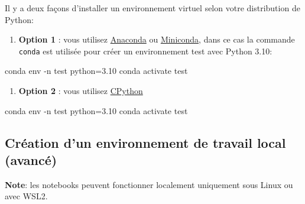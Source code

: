 \documentclass[
  11pt,
  letterpaper,
  open=any,
  twoside=false,
  french]{scrbook}
\newenvironment{Shaded}{\begin{snugshade}}{\end{snugshade}}
\newcommand{\AttributeTok}[1]{\textcolor[rgb]{0.40,0.45,0.13}{#1}}
\newcommand{\ExtensionTok}[1]{\textcolor[rgb]{0.00,0.23,0.31}{#1}}
\newcommand{\NormalTok}[1]{\textcolor[rgb]{0.00,0.23,0.31}{#1}}
\providecommand{\tightlist}{%
  \setlength{\itemsep}{0pt}\setlength{\parskip}{0pt}}\usepackage{longtable,booktabs,array}
\begin{document}
Il y a deux façons d'installer un environnement virtuel selon votre
distribution de Python:

\begin{enumerate}
\def\labelenumi{\arabic{enumi}.}
\tightlist
\item
  \textbf{Option 1} : vous utilisez
  \href{https://www.anaconda.com/download}{Anaconda} ou
  \href{https://docs.anaconda.com/miniconda/miniconda-install/}{Miniconda},
  dans ce cas la commande \texttt{conda} est utilisée pour créer un
  environnement test avec Python 3.10:
\end{enumerate}

\begin{Shaded}
\begin{Highlighting}[]
\ExtensionTok{conda}\NormalTok{ env }\AttributeTok{{-}n}\NormalTok{ test python=3.10}
\ExtensionTok{conda}\NormalTok{ activate test}
\end{Highlighting}
\end{Shaded}

\begin{enumerate}
\def\labelenumi{\arabic{enumi}.}
\setcounter{enumi}{1}
\tightlist
\item
  \textbf{Option 2} : vous utilisez
  \href{https://www.python.org/downloads/}{CPython}
\end{enumerate}

\begin{Shaded}
\begin{Highlighting}[]
\ExtensionTok{conda}\NormalTok{ env }\AttributeTok{{-}n}\NormalTok{ test python=3.10}
\ExtensionTok{conda}\NormalTok{ activate test}
\end{Highlighting}
\end{Shaded}

\subsection{Création d'un environnement de travail local
(avancé)}\label{cruxe9ation-dun-environnement-de-travail-local-avancuxe9}

\textbf{Note}: les notebooks peuvent fonctionner localement uniquement
sous Linux ou avec WSL2.
\end{document}
